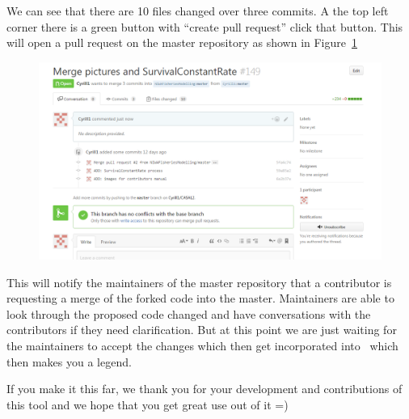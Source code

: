 We can see that there are 10 files changed over three commits. A the top left corner there is a green button with \enquote{create pull request} click that button. This will open a pull request on the master repository as shown in Figure~\ref{fig:fork_merge2}
\begin{figure}[!ht]
	\includegraphics[scale=0.6]{Figures/Pull_request1.png}
	\caption{}\label{fig:fork_merge2}
\end{figure}

This will notify the maintainers of the master repository that a contributor is requesting a merge of the forked code into the master. Maintainers are able to look through the proposed code changed and have conversations with the contributors if they need clarification. But at this point we are just waiting for the maintainers to accept the changes which then get incorporated into \CNAME\ which then makes you a legend.

If you make it this far, we thank you for your development and contributions of this tool and we hope that you get great use out of it =)



